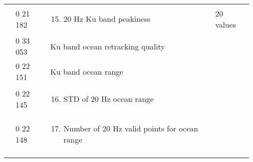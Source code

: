 \begin{longtable}[]{@{}llll@{}}
\begin{minipage}[t]{0.22\columnwidth}
\strut
\end{minipage} & \begin{minipage}[t]{0.22\columnwidth}\raggedright
0 21 182\strut
\end{minipage} & \begin{minipage}[t]{0.22\columnwidth}\raggedright
\begin{enumerate}
\setcounter{enumi}{14}
\item
  20 Hz Ku band peakiness
\end{enumerate}\strut
\end{minipage} & \begin{minipage}[t]{0.22\columnwidth}\raggedright
20 values\strut
\end{minipage}\tabularnewline
& 0 33 053 & Ku band ocean retracking quality &\tabularnewline
& 0 22 151 & Ku band ocean range &\tabularnewline
\begin{minipage}[t]{0.22\columnwidth}\raggedright
\strut
\end{minipage} & \begin{minipage}[t]{0.22\columnwidth}\raggedright
0 22 145\strut
\end{minipage} & \begin{minipage}[t]{0.22\columnwidth}\raggedright
\begin{enumerate}
\setcounter{enumi}{15}
\item
  STD of 20 Hz ocean range
\end{enumerate}\strut
\end{minipage} & \begin{minipage}[t]{0.22\columnwidth}\raggedright
\strut
\end{minipage}\tabularnewline
\begin{minipage}[t]{0.22\columnwidth}\raggedright
\strut
\end{minipage} & \begin{minipage}[t]{0.22\columnwidth}\raggedright
0 22 148\strut
\end{minipage} & \begin{minipage}[t]{0.22\columnwidth}\raggedright
\begin{enumerate}
\setcounter{enumi}{16}
\item
  Number of 20 Hz valid points for ocean range
\end{enumerate}\strut
\end{minipage} & \begin{minipage}[t]{0.22\columnwidth}\raggedright
\strut
\end{minipage}\tabularnewline
\begin{minipage}[t]{0.22\columnwidth}\raggedright

\end{minipage}
\end{longtable}
